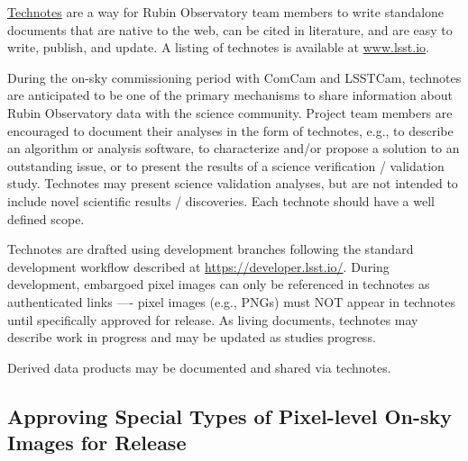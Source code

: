 \documentclass[SE,authoryear,toc]{lsstdoc}
\begin{document}
\href{https://developer.lsst.io/project-docs/technotes.html}{Technotes} are a way for Rubin Observatory team members to write standalone documents that are native to the web, can be cited in literature, and are easy to write, publish, and update.
A listing of technotes is available at \url{www.lsst.io}.

During the on-sky commissioning period with ComCam and LSSTCam, technotes are anticipated to be one of the primary mechanisms to share information about Rubin Observatory data with the science community.
Project team members are encouraged to document their analyses in the form of technotes, e.g., to describe an algorithm or analysis software, to characterize and/or propose a solution to an outstanding issue, or to present the results of a science verification / validation study.
Technotes may present science validation analyses, but are not intended to include novel scientific results / discoveries.
Each technote should have a well defined scope.

Technotes are drafted using development branches following the standard development workflow described at \url{https://developer.lsst.io/}.
During development, embargoed pixel images can only be referenced in technotes as authenticated links —- pixel images (e.g., PNGs) must NOT appear in technotes until specifically approved for release.
As living documents, technotes may describe work in progress and may be updated as studies progress.

Derived data products may be documented and shared via technotes.

\subsection{Approving Special Types of Pixel-level On-sky Images for Release}
\label{special_classes}
\end{document}
